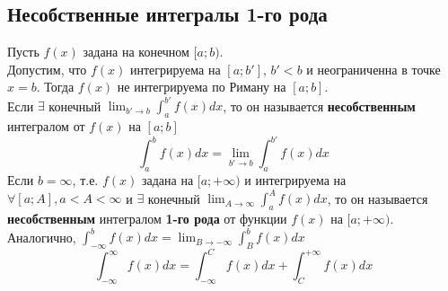 \documentclass[12pt]{article}
\begin{document}
    \subsection{Несобственные интегралы 1-го рода}\noindent
    Пусть $f(x)$ задана на конечном $[a;b)$.\\
    Допустим, что $f(x)$ интегрируема на $[a;b']$, $b'<b$ и неограниченна в точке $x=b$. Тогда $f(x)$ не интегрируема по Риману на $[a;b]$.\\
    Если $\exists$ конечный $\lim_{b' \to b} \int_{a}^{b'}f(x)dx$, то он называется \textbf{несобственным} интегралом от $f(x)$ на $[a; b]$
    \[ \int_{a}^{b}f(x)dx=\lim_{b' \to b}\int_{a}^{b'} f(x)dx \]
    Если $b=\infty$, т.е. $f(x)$ задана на $[a; +\infty)$ и интегрируема на $\forall [a;A],a<A<\infty$ и $\exists$ конечный $\lim_{A \to \infty}\int_{a}^{A} f(x)dx$, то он называется \textbf{несобственным} интегралом \textbf{1-го рода} от функции $f(x)$ на $[a;+\infty)$.\\
    Аналогично, $\int_{-\infty}^{b}f(x)dx=\lim_{B \to -\infty} \int_{B}^{b}f(x)dx$\\
    \[ \int_{-\infty}^{\infty} f(x)dx=\int_{-\infty}^{C}f(x)dx+\int_{C}^{+\infty}f(x)dx \]
\end{document}
